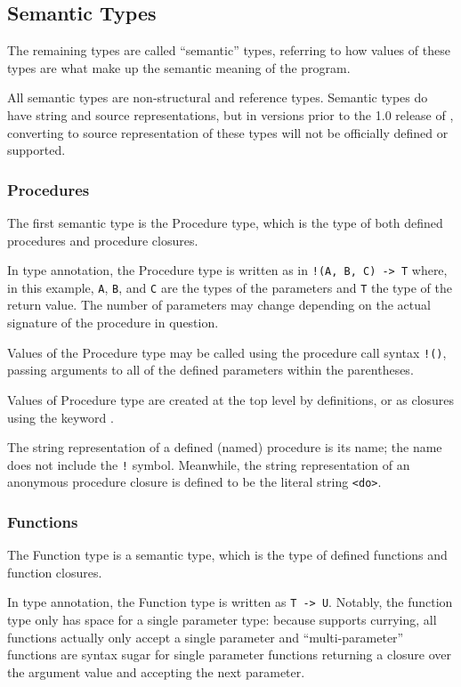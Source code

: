 \subsection{Semantic Types}

The remaining types are called ``semantic'' types, referring to how values of these
types are what make up the semantic meaning of the program.

All semantic types are non-structural and reference types. Semantic types do
have string and source representations, but in versions prior to the 1.0
release of \Trilogy{}, converting to source representation of these types will
not be officially defined or supported.

\subsubsection{Procedures}

The first semantic type is the Procedure type, which is the type of both
defined procedures and procedure closures.

In type annotation, the Procedure type is written as in \texttt{!(A, B, C) -> T}
where, in this example, \texttt{A}, \texttt{B}, and \texttt{C} are the types of
the parameters and \texttt{T} the type of the return value. The number of parameters
may change depending on the actual signature of the procedure in question.

Values of the Procedure type may be called using the procedure call syntax \texttt{!()},
passing arguments to all of the defined parameters within the parentheses.

Values of Procedure type are created at the top level by  definitions, or as
closures using the keyword .

The string representation of a defined (named) procedure is its name; the name does
not include the \texttt{!} symbol. Meanwhile, the string representation of an anonymous
procedure closure is defined to be the literal string \texttt{<do>}.

\subsubsection{Functions}

The Function type is a semantic type, which is the type of defined functions and
function closures.

In type annotation, the Function type is written as \texttt{T -> U}. Notably, the
function type only has space for a single parameter type: because \Poetry{} supports
currying, all functions actually only accept a single parameter and ``multi-parameter''
functions are syntax sugar for single parameter functions returning a closure over
the argument value and accepting the next parameter.

